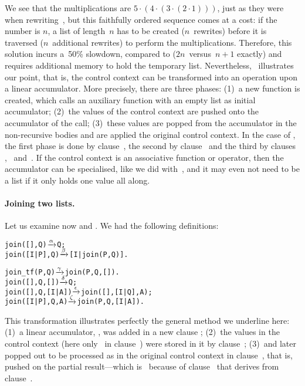 We see that the multiplications are \(5 \cdot (4 \cdot (3 \cdot (2
\cdot 1)))\), just as they were when rewriting~, but
this faithfully ordered sequence comes at a cost: if the number is
\(n\), a list of length~\(n\) has to be created (\(n\)~rewrites)
before it is traversed (\(n\)~additional rewrites) to perform the
multiplications. Therefore, this solution incurs a~50\% slowdown,
compared to  (\(2n\)~versus~\(n+1\) exactly) and
requires additional memory to hold the temporary list. Nevertheless,
~illustrates our point, that is, the control
context can be transformed into an operation upon a linear
accumulator. More precisely, there are three phases: (1)~a new
function is created, which calls an auxiliary function with an empty
list as initial accumulator; (2)~the values of the control context are
pushed onto the accumulator of the call; (3)~these values are popped
from the accumulator in the non\hyp{}recursive bodies and are applied
the original control context. In the case of
, the first phase is done by
clause~\clause{\alpha}, the second by clause~\clause{\gamma} and the
third by clauses \clause{\beta},
\clause{\delta}~and~\clause{\epsilon}. If the control context is an
associative function or operator, then the accumulator can be
specialised, like we did with~, and it may even
not need to be a list if it only holds one value all along.

\medskip

\paragraph{Joining two lists.}

Let us examine now  and . We had
the following definitions:
\begin{alltt}
join(   [],Q)       \(\smashedrightarrow{\alpha}\) Q;
join([I|P],Q)       \(\smashedrightarrow{\beta}\) [I|join(P,Q)].

join_tf(P,Q)        \(\smashedrightarrow{\gamma}\) join(P,Q,[]).
join(   [],Q,   []) \(\smashedrightarrow{\delta}\) Q;
join(   [],Q,[I|A]) \(\smashedrightarrow{\epsilon}\) join([],[I|Q],A);
join([I|P],Q,    A) \(\smashedrightarrow{\zeta}\) join(P,Q,[I|A]).
\end{alltt}
This transformation illustrates perfectly the general method we
underline here: (1)~a linear accumulator, , was added in a
new clause \clause{\gamma}; (2)~the values in the control context
(here only~ in clause~\clause{\beta}) were stored in it by
clause~\clause{\zeta}; (3)~and later popped out to be processed as in
the original control context in clause~\clause{\epsilon}, that is,
pushed on the partial result---which is~ because of
clause~\clause{\delta} that derives from clause~\clause{\alpha}.

